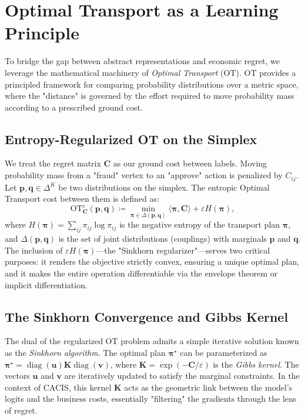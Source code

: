 \documentclass[sigconf,anonymous]{acmart}
\newcommand{\CACIS}{\textsc{CACIS}}
\newcommand{\vp}{\mathbf{p}}
\newcommand{\vq}{\mathbf{q}}
\newcommand{\mC}{\mathbf{C}}
\newcommand{\mK}{\mathbf{K}}
\newcommand{\OT}{\mathrm{OT}}
\DeclareMathOperator{\diag}{diag}
\begin{document}
\section{Optimal Transport as a Learning Principle}
\label{sec:ot}
To bridge the gap between abstract representations and economic regret, we leverage the mathematical machinery of \emph{Optimal Transport} (OT). OT provides a principled framework for comparing probability distributions over a metric space, where the "distance" is governed by the effort required to move probability mass according to a prescribed ground cost.

\subsection{Entropy-Regularized OT on the Simplex}
We treat the regret matrix $\mC$ as our ground cost between labels. Moving probability mass from a "fraud" vertex to an "approve" action is penalized by $C_{ij}$. Let $\vp, \vq \in \Delta^K$ be two distributions on
the simplex. The entropic Optimal Transport cost between them is defined as:
\begin{equation}
    \OT^{\varepsilon}_{\mC}(\vp, \vq) \coloneqq \min_{\bm{\pi} \in \Delta(\vp, \vq)} \langle \bm{\pi}, \mC \rangle + \varepsilon H(\bm{\pi}),
\end{equation}
where $H(\bm{\pi}) = \sum_{ij} \pi_{ij} \log \pi_{ij}$ is the negative entropy of the transport plan $\bm{\pi}$, and $\Delta(\vp, \vq)$ is the set of joint distributions (couplings)
with marginals $\vp$ and $\vq$. The inclusion of $\varepsilon H(\bm{\pi})$—the "Sinkhorn regularizer"—serves two critical purposes: it renders the objective strictly convex, ensuring a unique optimal plan, and it makes the entire operation differentiable via the envelope theorem or implicit differentiation.

\subsection{The Sinkhorn Convergence and Gibbs Kernel}
The dual of the regularized OT problem admits a simple iterative solution known as the \emph{Sinkhorn algorithm}. The optimal plan $\bm{\pi}^\star$ can be parameterized as $\bm{\pi}^\star = \diag(\mathbf{u}) \mK \diag(\mathbf{v})$, where $\mK = \exp(-\mC/\varepsilon)$ is the \emph{Gibbs kernel}. The vectors $\mathbf{u}$ and $\mathbf{v}$ are iteratively updated to satisfy the marginal constraints. In the context of \CACIS{}, this kernel $\mK$ acts as the geometric link between the model's logits and the business costs, essentially "filtering" the gradients through the lens of regret.
\end{document}
